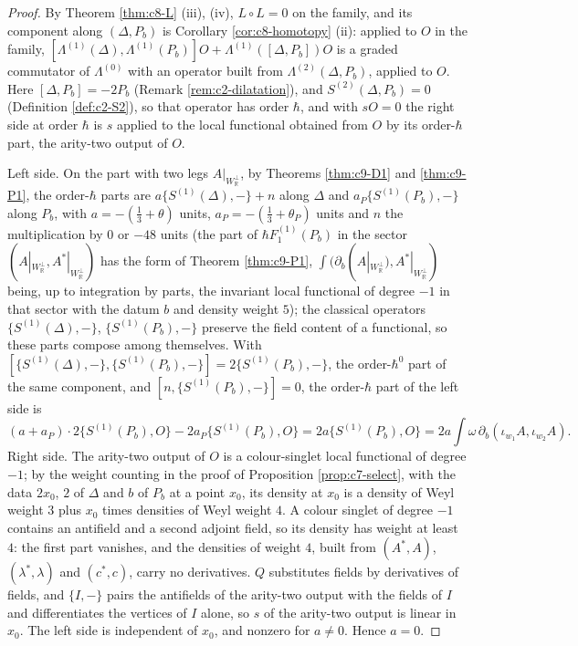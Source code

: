 \begin{proof}
By Theorem \ref{thm:c8-L} (iii), (iv), $L\circ L=0$ on the family, and its component along $(\Delta,P_b)$ is Corollary \ref{cor:c8-homotopy} (ii): applied to $O$ in the family, $[\Lambda^{(1)}(\Delta),\Lambda^{(1)}(P_b)]O+\Lambda^{(1)}([\Delta,P_b])O$ is a graded commutator of $\Lambda^{(0)}$ with an operator built from $\Lambda^{(2)}(\Delta,P_b)$, applied to $O$. Here $[\Delta,P_b]=-2P_b$ (Remark \ref{rem:c2-dilatation}), and $S^{(2)}(\Delta,P_b)=0$ (Definition \ref{def:c2-S2}), so that operator has order $\hbar$, and with $sO=0$ the right side at order $\hbar$ is $s$ applied to the local functional obtained from $O$ by its order-$\hbar$ part, the arity-two output of $O$.

Left side. On the part with two legs $A|_{W_{\mathbb R}^\perp}$, by Theorems \ref{thm:c9-D1} and \ref{thm:c9-P1}, the order-$\hbar$ parts are $a\{S^{(1)}(\Delta),-\}+n$ along $\Delta$ and $a_P\{S^{(1)}(P_b),-\}$ along $P_b$, with $a=-(\tfrac13+\theta)$ units, $a_P=-(\tfrac13+\theta_P)$ units and $n$ the multiplication by $0$ or $-48$ units (the part of $\hbar F_1^{(1)}(P_b)$ in the sector $(A|_{W_{\mathbb R}^\perp},A^*|_{W_{\mathbb R}^\perp})$ has the form of Theorem \ref{thm:c9-P1}, $\int(\partial_b(A|_{W_{\mathbb R}^\perp}),A^*|_{W_{\mathbb R}^\perp})$ being, up to integration by parts, the invariant local functional of degree $-1$ in that sector with the datum $b$ and density weight $5$); the classical operators $\{S^{(1)}(\Delta),-\}$, $\{S^{(1)}(P_b),-\}$ preserve the field content of a functional, so these parts compose among themselves. With $[\{S^{(1)}(\Delta),-\},\{S^{(1)}(P_b),-\}]=2\{S^{(1)}(P_b),-\}$, the order-$\hbar^0$ part of the same component, and $[n,\{S^{(1)}(P_b),-\}]=0$, the order-$\hbar$ part of the left side is
\[
(a+a_P)\cdot2\{S^{(1)}(P_b),O\}-2a_P\{S^{(1)}(P_b),O\}=2a\{S^{(1)}(P_b),O\}=2a\int\omega\,\partial_b(\iota_{w_1}A,\iota_{w_2}A).
\]
Right side. The arity-two output of $O$ is a colour-singlet local functional of degree $-1$; by the weight counting in the proof of Proposition \ref{prop:c7-select}, with the data $2x_0$, $2$ of $\Delta$ and $b$ of $P_b$ at a point $x_0$, its density at $x_0$ is a density of Weyl weight $3$ plus $x_0$ times densities of Weyl weight $4$. A colour singlet of degree $-1$ contains an antifield and a second adjoint field, so its density has weight at least $4$: the first part vanishes, and the densities of weight $4$, built from $(A^*,A)$, $(\lambda^*,\lambda)$ and $(c^*,c)$, carry no derivatives. $Q$ substitutes fields by derivatives of fields, and $\{I,-\}$ pairs the antifields of the arity-two output with the fields of $I$ and differentiates the vertices of $I$ alone, so $s$ of the arity-two output is linear in $x_0$. The left side is independent of $x_0$, and nonzero for $a\neq0$. Hence $a=0$.
\end{proof}

